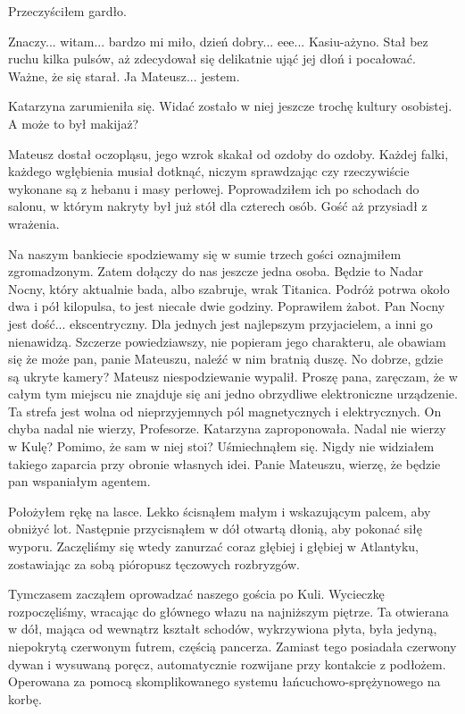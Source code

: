 Przeczyściłem gardło.
\begin{dialogue}
\ds{} Znaczy... witam... bardzo mi miło, dzień dobry... eee... Kasiu-ażyno. \dm{} Stał bez ruchu kilka pulsów, aż zdecydował się delikatnie ująć jej dłoń i pocałować.
Ważne, że się starał. \dm{} Ja Mateusz... jestem.
\end{dialogue}

Katarzyna zarumieniła się. Widać zostało w niej jeszcze trochę kultury osobistej. A może to był makijaż?

Mateusz dostał oczopląsu, jego wzrok skakał od ozdoby do ozdoby. Każdej falki, każdego wgłębienia musiał dotknąć, niczym sprawdzając czy rzeczywiście wykonane są z hebanu i masy perłowej. 
Poprowadziłem ich po schodach do salonu, w którym nakryty był już stół dla czterech osób.
Gość aż przysiadł z wrażenia.
\begin{dialogue}
\ds{} Na naszym bankiecie spodziewamy się w sumie trzech gości \dm{} oznajmiłem zgromadzonym. \dm{} Zatem dołączy do nas jeszcze jedna osoba.
Będzie to Nadar Nocny, który aktualnie bada, albo szabruje, wrak Titanica. Podróż potrwa około dwa i pół kilopulsa, to jest niecałe dwie godziny.
\dm{} Poprawiłem żabot. \dm{}
Pan Nocny jest dość... ekscentryczny. Dla jednych jest najlepszym przyjacielem, a inni go nienawidzą.
Szczerze powiedziawszy, nie popieram jego charakteru, ale obawiam się że może pan, panie Mateuszu, naleźć w nim bratnią duszę.
\ds{} No dobrze, gdzie są ukryte kamery? \dm{} Mateusz niespodziewanie wypalił.
\ds{} Proszę pana, zaręczam, że w całym tym miejscu nie znajduje się ani jedno obrzydliwe elektroniczne urządzenie. Ta strefa jest wolna od nieprzyjemnych pól magnetycznych i elektrycznych.
\ds{} On chyba nadal nie wierzy, Profesorze. \dm{} Katarzyna zaproponowała. 
\ds{} Nadal nie wierzy w Kulę? Pomimo, że sam w niej stoi? \dm{} Uśmiechnąłem się. \dm{} Nigdy nie widziałem takiego zaparcia przy obronie własnych idei. Panie Mateuszu, wierzę, że będzie pan wspaniałym agentem.
\end{dialogue}

Położyłem rękę na lasce. Lekko ścisnąłem małym i wskazującym palcem, aby obniżyć lot.
Następnie przycisnąłem w dół otwartą dłonią, aby pokonać siłę wyporu.
Zaczęliśmy się wtedy zanurzać coraz głębiej i głębiej w Atlantyku, zostawiając za sobą pióropusz tęczowych rozbryzgów.

Tymczasem zacząłem oprowadzać naszego gościa po Kuli.
Wycieczkę rozpoczęliśmy, wracając do głównego włazu na najniższym piętrze.
Ta otwierana w dół, mająca od wewnątrz kształt schodów, wykrzywiona płyta, była jedyną, niepokrytą czerwonym futrem, częścią pancerza.
Zamiast tego posiadała czerwony dywan i wysuwaną poręcz, automatycznie rozwijane przy kontakcie z podłożem.
Operowana za pomocą skomplikowanego systemu łańcuchowo-sprężynowego na korbę.

